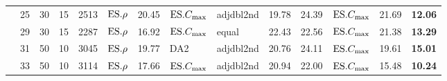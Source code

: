 {\begin{longtable}{l@{}rr@{$\times$}lr|lr|llr|r|lr|r}
&25 & 30&15 & 2513 & $\text{ES}.{\rho}$ & 20.45 & $\text{ES}.{C_{\max}}$ & adjdbl2nd & 19.78 & 
24.39 & $\text{ES}.{C_{\max}}$ & 21.69 & \textbf{12.06} \\ 
&29 & 30&15 & 2287 & $\text{ES}.{\rho}$ & 16.92 & $\text{ES}.{C_{\max}}$ & equal & 22.43 & 22.56 & 
$\text{ES}.{C_{\max}}$ & 21.38 & \textbf{13.29} \\ 
&31 & 50&10 & 3045 & $\text{ES}.{\rho}$ & 19.77 & DA2 & adjdbl2nd & 20.76 & 
24.11 & $\text{ES}.{C_{\max}}$ & 19.61 & \textbf{15.01} \\ 
&33 & 50&10 & 3114 & $\text{ES}.{\rho}$ & 17.66 & $\text{ES}.{C_{\max}}$ & adjdbl2nd & 20.94 & 22.00 
& $\text{ES}.{C_{\max}}$ & 15.48 & \textbf{10.24} \\ 
\end{longtable}}
